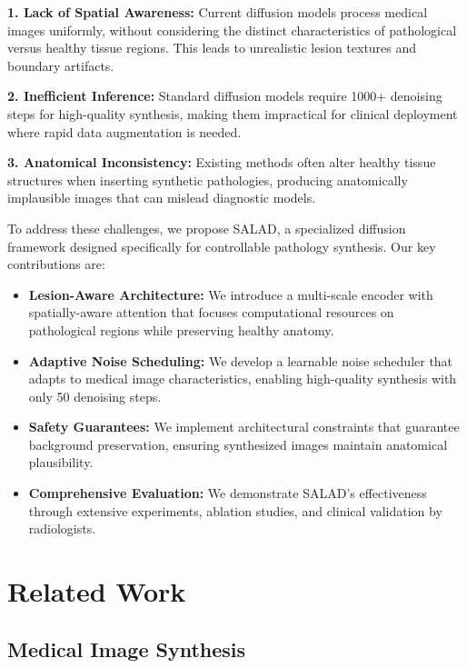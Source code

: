 \documentclass[10pt,twocolumn]{article}
\begin{document}
\textbf{1. Lack of Spatial Awareness:} Current diffusion models process medical images uniformly, without considering the distinct characteristics of pathological versus healthy tissue regions. This leads to unrealistic lesion textures and boundary artifacts.

\textbf{2. Inefficient Inference:} Standard diffusion models require 1000+ denoising steps for high-quality synthesis, making them impractical for clinical deployment where rapid data augmentation is needed.

\textbf{3. Anatomical Inconsistency:} Existing methods often alter healthy tissue structures when inserting synthetic pathologies, producing anatomically implausible images that can mislead diagnostic models.

To address these challenges, we propose SALAD, a specialized diffusion framework designed specifically for controllable pathology synthesis. Our key contributions are:

\begin{itemize}
\item \textbf{Lesion-Aware Architecture:} We introduce a multi-scale encoder with spatially-aware attention that focuses computational resources on pathological regions while preserving healthy anatomy.

\item \textbf{Adaptive Noise Scheduling:} We develop a learnable noise scheduler that adapts to medical image characteristics, enabling high-quality synthesis with only 50 denoising steps.

\item \textbf{Safety Guarantees:} We implement architectural constraints that guarantee background preservation, ensuring synthesized images maintain anatomical plausibility.

\item \textbf{Comprehensive Evaluation:} We demonstrate SALAD's effectiveness through extensive experiments, ablation studies, and clinical validation by radiologists.
\end{itemize}

\section{Related Work}

\subsection{Medical Image Synthesis}
\end{document}
